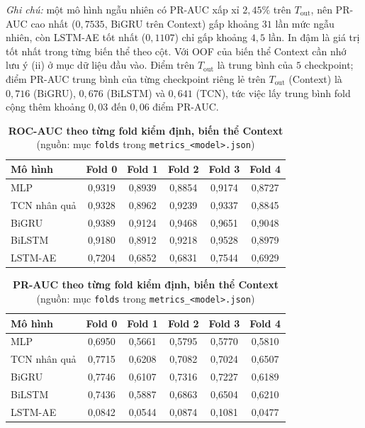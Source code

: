 \textit{Ghi chú:} một mô hình ngẫu nhiên có PR-AUC xấp xỉ $2{,}45\%$ trên $T_{\text{out}}$, nên PR-AUC cao nhất ($0{,}7535$, BiGRU trên Context) gấp khoảng $31$ lần mức ngẫu nhiên, còn LSTM-AE tốt nhất ($0{,}1107$) chỉ gấp khoảng $4{,}5$ lần. In đậm là giá trị tốt nhất trong từng biến thể theo cột. Với OOF của biến thể Context cần nhớ lưu ý (ii) ở mục dữ liệu đầu vào. Điểm trên $T_{\text{out}}$ là trung bình của $5$ checkpoint; điểm PR-AUC trung bình của từng checkpoint riêng lẻ trên $T_{\text{out}}$ (Context) là $0{,}716$ (BiGRU), $0{,}676$ (BiLSTM) và $0{,}641$ (TCN), tức việc lấy trung bình fold cộng thêm khoảng $0{,}03$ đến $0{,}06$ điểm PR-AUC.

\begin{table}[H]
\centering
\caption{\textbf{ROC-AUC theo từng fold kiểm định, biến thể Context} (nguồn: mục \texttt{folds} trong \texttt{metrics\_<model>.json})}
\label{tab:dl_per_fold}
\renewcommand{\arraystretch}{1.2}
\begin{tabular}{|l|c|c|c|c|c|}
\hline
\textbf{Mô hình} & \textbf{Fold 0} & \textbf{Fold 1} & \textbf{Fold 2} & \textbf{Fold 3} & \textbf{Fold 4} \\ \hline
MLP & 0{,}9319 & 0{,}8939 & 0{,}8854 & 0{,}9174 & 0{,}8727 \\ \hline
TCN nhân quả & 0{,}9328 & 0{,}8962 & 0{,}9239 & 0{,}9337 & 0{,}8845 \\ \hline
BiGRU & 0{,}9389 & 0{,}9124 & 0{,}9468 & 0{,}9651 & 0{,}9048 \\ \hline
BiLSTM & 0{,}9180 & 0{,}8912 & 0{,}9218 & 0{,}9528 & 0{,}8979 \\ \hline
LSTM-AE & 0{,}7204 & 0{,}6852 & 0{,}6831 & 0{,}7544 & 0{,}6929 \\ \hline
\end{tabular}
\end{table}

\begin{table}[H]
\centering
\caption{\textbf{PR-AUC theo từng fold kiểm định, biến thể Context} (nguồn: mục \texttt{folds} trong \texttt{metrics\_<model>.json})}
\label{tab:dl_per_fold_pr}
\renewcommand{\arraystretch}{1.2}
\begin{tabular}{|l|c|c|c|c|c|}
\hline
\textbf{Mô hình} & \textbf{Fold 0} & \textbf{Fold 1} & \textbf{Fold 2} & \textbf{Fold 3} & \textbf{Fold 4} \\ \hline
MLP & 0{,}6950 & 0{,}5661 & 0{,}5795 & 0{,}5770 & 0{,}5810 \\ \hline
TCN nhân quả & 0{,}7715 & 0{,}6208 & 0{,}7082 & 0{,}7024 & 0{,}6507 \\ \hline
BiGRU & 0{,}7746 & 0{,}6107 & 0{,}7316 & 0{,}7227 & 0{,}6189 \\ \hline
BiLSTM & 0{,}7436 & 0{,}5887 & 0{,}6863 & 0{,}6504 & 0{,}6210 \\ \hline
LSTM-AE & 0{,}0842 & 0{,}0544 & 0{,}0874 & 0{,}1081 & 0{,}0477 \\ \hline
\end{tabular}
\end{table}

